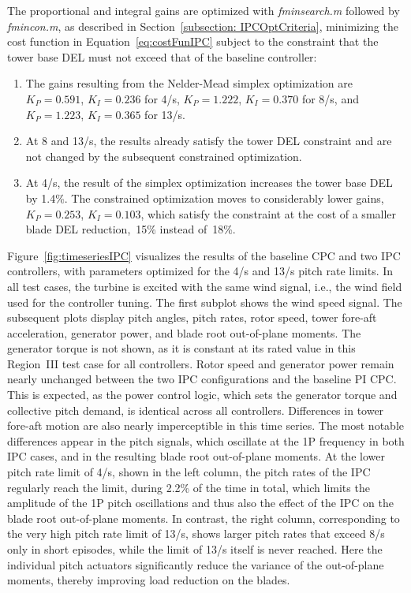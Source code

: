 The proportional and integral gains are optimized with \textit{fminsearch.m} followed by \textit{fmincon.m}, as described in Section~\ref{subsection: IPCOptCriteria}, minimizing the cost function in Equation~\eqref{eq:costFunIPC} subject to the constraint that the tower base DEL must not exceed that of the baseline controller:
\begin{enumerate}
    \item The gains resulting from the Nelder-Mead simplex optimization are $K_P = 0.591$, $K_I = 0.236$ for 4\textdegree/s, $K_P = 1.222$, $K_I = 0.370$ for 8\textdegree/s, and $K_P = 1.223$, $K_I = 0.365$ for 13\textdegree/s.
    \item At 8 and 13\textdegree/s, the results already satisfy the tower DEL constraint and are not changed by the subsequent constrained optimization.
    \item At 4\textdegree/s, the result of the simplex optimization increases the tower base DEL by 1.4\%. The constrained optimization moves to considerably lower gains, $K_P = 0.253$, $K_I = 0.103$, which satisfy the constraint at the cost of a smaller blade DEL reduction,~15\% instead of~18\%.
\end{enumerate}
%
Figure~\ref{fig:timeseriesIPC} visualizes the results of the baseline CPC and two IPC controllers, with parameters optimized for the 4\textdegree/s and 13\textdegree/s pitch rate limits. In all test cases, the turbine is excited with the same wind signal, i.e., the wind field used for the controller tuning. The first subplot shows the wind speed signal. The subsequent plots display pitch angles, pitch rates, rotor speed, tower fore-aft acceleration, generator power, and blade root out-of-plane moments. The generator torque is not shown, as it is constant at its rated value in this Region~III test case for all controllers. Rotor speed and generator power remain nearly unchanged between the two IPC configurations and the baseline PI CPC. This is expected, as the power control logic, which sets the generator torque and collective pitch demand, is identical across all controllers. Differences in tower fore-aft motion are also nearly imperceptible in this time series. The most notable differences appear in the pitch signals, which oscillate at the 1P frequency in both IPC cases, and in the resulting blade root out-of-plane moments. At the lower pitch rate limit of 4\textdegree/s, shown in the left column, the pitch rates of the IPC regularly reach the limit, during 2.2\% of the time in total, which limits the amplitude of the 1P pitch oscillations and thus also the effect of the IPC on the blade root out-of-plane moments. In contrast, the right column, corresponding to the very high pitch rate limit of 13\textdegree/s, shows larger pitch rates that exceed 8\textdegree/s only in short episodes, while the limit of 13\textdegree/s itself is never reached. Here the individual pitch actuators significantly reduce the variance of the out-of-plane moments, thereby improving load reduction on the blades.
